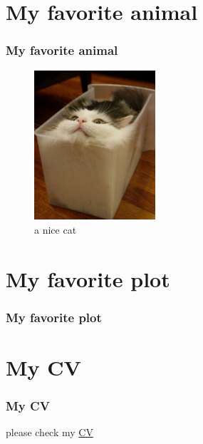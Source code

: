 \documentclass{beamer}
\begin{document}
\section{My favorite animal}

\begin{frame}
\frametitle{My favorite animal}
    \begin{figure}[h]
    \includegraphics[width=0.4\textwidth]{cat.jpg}
    \centering
    \caption{a nice cat}
    \label{fig:photo1}
    \end{figure}
\end{frame}

\section{My favorite plot}

\begin{frame}
\frametitle{My favorite plot}

\end{frame}

\section{My CV}

\begin{frame}
\frametitle{My CV}

please check my \href{https://tomchoi91.github.io/CV/CV_CHOI_TOM.html}{CV}

\end{frame}
\end{document}
